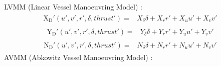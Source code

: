 \documentclass[review]{elsarticle}
\begin{document}
\sphinxAtStartPar
LVMM (Linear Vessel Manoeuvring Model) \cite{matusiak_dynamics_2017}:
\begin{equation}\label{equation:02.01_VMMs:eqxlinear}
\begin{split}\begin{split}
\operatorname{X_{D}'}{\left(u',v',r',\delta,thrust' \right)} = & X_{\delta} \delta + X_{r} r' + X_{u} u' + X_{v} v' 
\end{split}\end{split}
\end{equation}\begin{equation}\label{equation:02.01_VMMs:eqylinear}
\begin{split}\begin{split}
\operatorname{Y_{D}'}{\left(u',v',r',\delta,thrust' \right)} = & Y_{\delta} \delta + Y_{r} r' + Y_{u} u' + Y_{v} v' 
\end{split}\end{split}
\end{equation}\begin{equation}\label{equation:02.01_VMMs:eqnlinear}
\begin{split}\begin{split}
\operatorname{N_{D}'}{\left(u',v',r',\delta,thrust' \right)} = & N_{\delta} \delta + N_{r} r' + N_{u} u' + N_{v} v' 
\end{split}\end{split}
\end{equation}
\sphinxAtStartPar
AVMM (Abkowitz Vessel Manoeuvring Model) \cite{abkowitz_ship_1964}:
\end{document}
